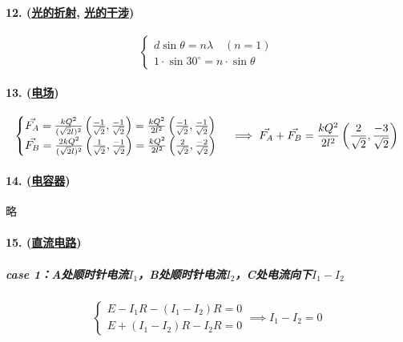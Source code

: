 \paragraph{12. (\hyperref[subsec:光的折射]{光的折射}, \hyperref[subsec:光的干涉]{光的干涉})}

\begin{equation*}
    \begin{cases}
        d\sin\theta=n\lambda\quad(n=1)\\
        1\cdot\sin30^\circ=n\cdot\sin\theta
    \end{cases}
\end{equation*}

\paragraph{13. (\hyperref[subsec:电场]{电场})}

\begin{equation*}
    \begin{cases}
        \vec{F_A}=\frac{kQ^2}{(\sqrt2l)^2}\left(\frac{-1}{\sqrt2},\frac{-1}{\sqrt2}\right)=\frac{kQ^2}{2l^2}\left(\frac{-1}{\sqrt2},\frac{-1}{\sqrt2}\right)\\
        \vec{F_B}=\frac{2kQ^2}{(\sqrt2l)^2}\left(\frac{1}{\sqrt2},\frac{-1}{\sqrt2}\right)=\frac{kQ^2}{2l^2}\left(\frac{2}{\sqrt2},\frac{-2}{\sqrt2}\right)
    \end{cases}\implies
    \vec{F_A}+\vec{F_B}=\frac{kQ^2}{2l^2}\left(\frac{2}{\sqrt2},\frac{-3}{\sqrt2}\right)\\
\end{equation*}

\paragraph{14. (\hyperref[subsec:电容器]{电容器})} 略

\paragraph{15. (\hyperref[subsec:直流电路]{直流电路})}

\subparagraph{case 1：A处顺时针电流$I_1$，B处顺时针电流$I_2$，C处电流向下$I_1-I_2$}
\begin{equation*}
    \begin{cases}
        E-I_1R-(I_1-I_2)R=0\\
        E+(I_1-I_2)R-I_2R=0
    \end{cases}\implies I_1-I_2=0
\end{equation*}


